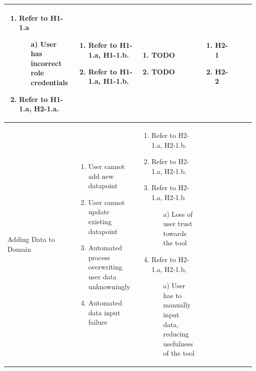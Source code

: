 \documentclass{article}
\begin{document}
\begin{landscape}
\begin{longtable}{|p{3cm}|p{3cm}|p{4cm}|p{4cm}|p{3cm}|p{2cm}|p{3cm}|}
\begin{enumerate}[leftmargin=*]
    \item  Refer to H1-1.a
    \begin{enumerate}
        \item[a)] User has incorrect role credentials
    \end{enumerate}
    \item Refer to H1-1.a, H2-1.a.
  \end{enumerate} &
  \begin{enumerate}[leftmargin=*]
       \item Refer to H1-1.a, H1-1.b.
       \item  Refer to H1-1.a, H1-1.b.
  \end{enumerate} &
  \begin{enumerate}[leftmargin=*]
       \item TODO
       \item TODO
  \end{enumerate} &
  \begin{enumerate}[leftmargin=*]
       \item H2-1
       \item H2-2
  \end{enumerate} \\
  \hline
  Adding Data to Domain & 
  \begin{enumerate}[leftmargin=*]
      \item User cannot add new datapoint
      \item User cannot update existing datapoint
      \item Automated process overwriting user data unknowningly
      \item Automated data input failure
  \end{enumerate} & 
  \begin{enumerate}[leftmargin=*]
      \item Refer to H2-1.a, H2-1.b.
      \item Refer to H2-1.a, H2-1.b.
      \item Refer to H2-1.a, H2-1.b 
      \begin{enumerate}
        \item[a)] Loss of user trust towards the tool
    \end{enumerate}
      \item Refer to H2-1.a, H2-1.b,
      \begin{enumerate}
        \item[a)] User has to manually input data, reducing usefulness of the tool
    \end{enumerate}

\end{enumerate}
\end{longtable}
\end{landscape}
\end{document}
